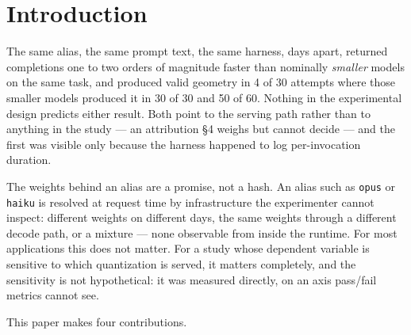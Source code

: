 \section{Introduction}

The same alias, the same prompt text, the same harness, days apart, returned completions one to two orders of magnitude faster than nominally \emph{smaller} models on the same task, and produced valid geometry in 4 of 30 attempts where those smaller models produced it in 30 of 30 and 50 of 60. Nothing in the experimental design predicts either result. Both point to the serving path rather than to anything in the study --- an attribution \S4 weighs but cannot decide --- and the first was visible only because the harness happened to log per-invocation duration.

The weights behind an alias are a promise, not a hash. An alias such as \texttt{opus} or \texttt{haiku} is resolved at request time by infrastructure the experimenter cannot inspect: different weights on different days, the same weights through a different decode path, or a mixture --- none observable from inside the runtime. For most applications this does not matter. For a study whose dependent variable is sensitive to which quantization is served, it matters completely, and the sensitivity is not hypothetical: it was measured directly, on an axis pass/fail metrics cannot see.

This paper makes four contributions.

